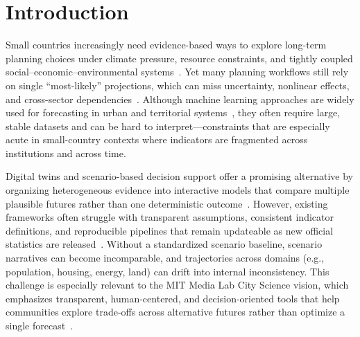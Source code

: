 \documentclass[urbansci,article,submit,pdftex,moreauthors]{Definitions/mdpi}
\begin{document}
\section{Introduction}
\label{sec:introduction}

Small countries increasingly need evidence-based ways to explore long-term
planning choices under climate pressure, resource constraints, and tightly
coupled social--economic--environmental systems~\cite{riahi2017ssps}. Yet many
planning workflows still rely on single ``most-likely'' projections, which can
miss uncertainty, nonlinear effects, and cross-sector
dependencies~\cite{amer2013scenario}. Although machine learning approaches are
widely used for forecasting in urban and territorial
systems~\cite{batty2018digitaltwins}, they often require large, stable datasets
and can be hard to interpret---constraints that are especially acute in
small-country contexts where indicators are fragmented across institutions and
across time.

Digital twins and scenario-based decision support offer a promising alternative
by organizing heterogeneous evidence into interactive models that compare
multiple plausible futures rather than one deterministic
outcome~\cite{batty2018digitaltwins}. However, existing frameworks often
struggle with transparent assumptions, consistent indicator definitions, and
reproducible pipelines that remain updateable as new official statistics are
released~\cite{udtreview2024}. Without a standardized scenario baseline,
scenario narratives can become incomparable, and trajectories across domains
(e.g., population, housing, energy, land) can drift into internal
inconsistency. This challenge is especially relevant to the MIT Media Lab City
Science vision, which emphasizes transparent, human-centered, and
decision-oriented tools that help communities explore trade-offs across
alternative futures rather than optimize a single
forecast~\cite{alonso2018cityscope,noyman2022cityscope}.
\end{document}
